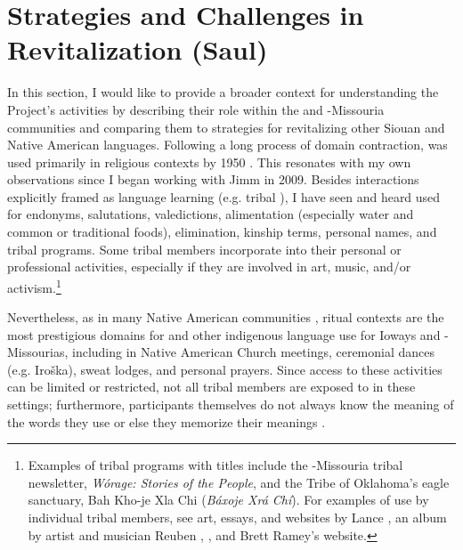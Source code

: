 \documentclass[output=paper]{LSP/langsci}
\begin{document}
\section{Strategies and Challenges in  Revitalization (Saul)}\label{saul}
In this section, I would like to provide a broader context for understanding the Project's activities by describing their role within the  and -Missouria communities and comparing them to strategies for revitalizing other Siouan and Native American languages. Following a long process of domain contraction,  was used primarily in religious contexts by 1950 \citep{Davidson1997, FurbeeStanley1996, FurbeeStanley2002}. This resonates with my own observations since I began working with Jimm in 2009. Besides interactions explicitly framed as language learning (e.g. tribal ), I have seen and heard  used for endonyms, salutations, valedictions, alimentation (especially water and common or traditional foods), elimination, kinship terms, personal names, and tribal programs. Some tribal members incorporate  into their personal or professional activities, especially if they are involved in art, music, and/or activism.\footnote{Examples of tribal programs with  titles include the -Missouria tribal newsletter, \emph{Wórage: Stories of the People}, and the  Tribe of Oklahoma's eagle sanctuary, Bah Kho-je Xla Chi (\emph{Báxoje Xrá Chí}). For examples of  use by individual tribal members, see art, essays, and websites by Lance \citet{Foster1989, Foster1996, Foster1999, Foster2009, FosterNDa, FosterNDb, FosterNDc}, an album by artist and musician Reuben \citet{Kent2004}, \citet{Jones2004}, and Brett Ramey's \citeyearpar{RameyND} website.} 

Nevertheless, as in many Native American communities \citep[see e.g.][]{Kroskrity1998}, ritual contexts are the most prestigious domains for  and other indigenous language use for Ioways and -Missourias, including in Native American Church meetings, ceremonial dances (e.g. Iroška), sweat lodges, and personal prayers. Since access to these activities can be limited or restricted, not all tribal members are exposed to  in these settings; furthermore, participants themselves do not always know the meaning of the  words they use or else they memorize their meanings \citep[see e.g.][520--521]{Davidson1997}.
\end{document}
